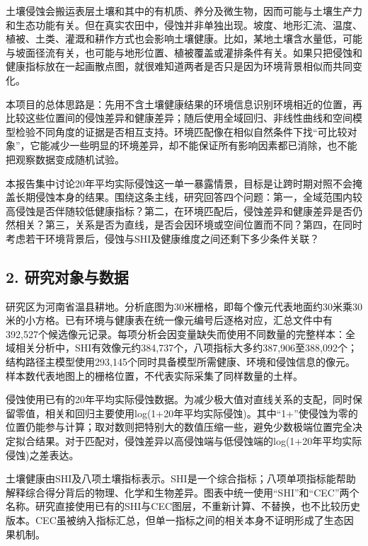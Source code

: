 \documentclass[
  10.5pt,
]{article}
\begin{document}
土壤侵蚀会搬运表层土壤和其中的有机质、养分及微生物，因而可能与土壤生产力和生态功能有关。但在真实农田中，侵蚀并非单独出现。坡度、地形汇流、温度、植被、土类、灌溉和耕作方式也会影响土壤健康。比如，某地土壤含水量低，可能与坡面径流有关，也可能与地形位置、植被覆盖或灌排条件有关。如果只把侵蚀和健康指标放在一起画散点图，就很难知道两者是否只是因为环境背景相似而共同变化。

本项目的总体思路是：先用不含土壤健康结果的环境信息识别环境相近的位置，再比较这些位置间的侵蚀差异和健康差异；随后使用全域回归、非线性曲线和空间模型检验不同角度的证据是否相互支持。环境匹配像在相似自然条件下找``可比较对象''，它能减少一些明显的环境差异，却不能保证所有影响因素都已消除，也不能把观察数据变成随机试验。

本报告集中讨论20年平均实际侵蚀这一单一暴露情景，目标是让跨时期对照不会掩盖长期侵蚀本身的结果。围绕这条主线，研究回答四个问题：第一，全域范围内较高侵蚀是否伴随较低健康指标？第二，在环境匹配后，侵蚀差异和健康差异是否仍然相关？第三，关系是否为直线，是否会因环境或空间位置而不同？第四，在同时考虑若干环境背景后，侵蚀与SHI及健康维度之间还剩下多少条件关联？

\hypertarget{ux7814ux7a76ux5bf9ux8c61ux4e0eux6570ux636e}{%
\subsection{2.
研究对象与数据}\label{ux7814ux7a76ux5bf9ux8c61ux4e0eux6570ux636e}}

研究区为河南省温县耕地。分析底图为30米栅格，即每个像元代表地面约30米乘30米的小方格。已有环境与健康表在统一像元编号后逐格对应，汇总文件中有392,527个候选像元记录。每项分析会因变量缺失而使用不同数量的完整样本：全域相关分析中，SHI有效像元约384,737个，八项指标大多约387,906至388,092个；结构路径主模型使用293,145个同时具备模型所需健康、环境和侵蚀信息的像元。样本数代表地图上的栅格位置，不代表实际采集了同样数量的土样。

侵蚀使用已有的20年平均实际侵蚀数据。为减少极大值对直线关系的支配，同时保留零值，相关和回归主要使用log(1+20年平均实际侵蚀)。其中``1+''使侵蚀为零的位置仍能参与计算；取对数则把特别大的数值压缩一些，避免少数极端位置完全决定拟合结果。对于匹配对，侵蚀差异以高侵蚀端与低侵蚀端的log(1+20年平均实际侵蚀)之差表达。

土壤健康由SHI及八项土壤指标表示。SHI是一个综合指标；八项单项指标能帮助解释综合得分背后的物理、化学和生物差异。图表中统一使用``SHI''和``CEC''两个名称。研究直接使用已有的SHI与CEC图层，不重新计算、不替换，也不比较历史版本。CEC虽被纳入指标汇总，但单一指标之间的相关本身不证明形成了生态因果机制。
\end{document}
